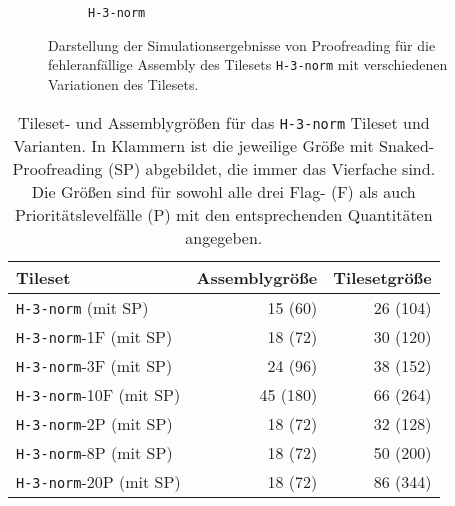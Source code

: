 \begin{figure}
\begin{subfigure}[b]{0.49\textwidth}
        \caption{\texttt{H-3-norm}}
    \end{subfigure}
    \caption[Simulationsergebnisse für Proofreading für fehleranfällige Assembly]{Darstellung der Simulationsergebnisse von Proofreading für die fehleranfällige Assembly des Tilesets \texttt{H-3-norm} mit verschiedenen Variationen des Tilesets.}
    \label{fig:proof_error_assemblies}
\end{figure}

\begin{table}
    \centering 
    \begin{tabular}{lrr}
        Tileset & Assemblygröße & Tilesetgröße \\\hline
        \texttt{H-3-norm} (mit SP)           & 15 (60)  & 26 (104) \\
        \texttt{H-3-norm}-1F (mit SP)       & 18 (72) & 30 (120) \\
        \texttt{H-3-norm}-3F (mit SP)       & 24 (96) & 38 (152) \\
        \texttt{H-3-norm}-10F (mit SP)      & 45 (180) & 66 (264) \\
        \texttt{H-3-norm}-2P (mit SP)       & 18 (72) & 32 (128) \\
        \texttt{H-3-norm}-8P (mit SP)       & 18 (72) & 50 (200) \\
        \texttt{H-3-norm}-20P (mit SP)      & 18 (72) & 86 (344) \\\hline
    \end{tabular}
    \caption[Tileset- und Assemblygrößen für das \texttt{H-3-norm} Tileset]{Tileset- und Assemblygrößen für das \texttt{H-3-norm} Tileset und Varianten. In Klammern ist die jeweilige Größe mit Snaked-Proofreading (SP) abgebildet, die immer das Vierfache sind. Die Größen sind für sowohl alle drei Flag- (F) als auch Prioritätslevelfälle (P) mit den entsprechenden Quantitäten angegeben.}
    \label{tab:proof_growth}
\end{table}

